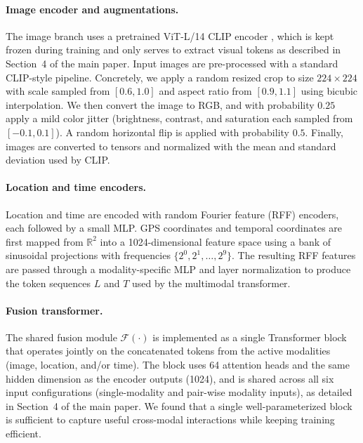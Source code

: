 \vspace{-1em}
\paragraph{Image encoder and augmentations.}
The image branch uses a pretrained ViT-L/14 CLIP encoder \cite{clip}, which is kept frozen during training and only serves to extract visual tokens as described in Section~4 of the main paper.
Input images are pre-processed with a standard CLIP-style pipeline.
Concretely, we apply a random resized crop to size $224\times224$ with scale sampled from $[0.6, 1.0]$ and aspect ratio from $[0.9, 1.1]$ using bicubic interpolation. 
We then convert the image to RGB, and with probability $0.25$ apply a mild color jitter (brightness, contrast, and saturation each sampled from $[-0.1, 0.1]$).
A random horizontal flip is applied with probability $0.5$.
Finally, images are converted to tensors and normalized with the mean and standard deviation used by CLIP.

\vspace{-1em}
\paragraph{Location and time encoders.}
Location and time are encoded with random Fourier feature (RFF) encoders, each followed by a small MLP.
GPS coordinates and temporal coordinates are first mapped from $\mathbb{R}^2$ into a 1024-dimensional feature space using a bank of sinusoidal projections with frequencies $\{2^0, 2^1, \dots, 2^9\}$.
The resulting RFF features are passed through a modality-specific MLP and layer normalization to produce the token sequences $L$ and $T$ used by the multimodal transformer.

\vspace{-1em}
\paragraph{Fusion transformer.}
The shared fusion module $\mathcal{F}(\cdot)$ is implemented as a single Transformer block that operates jointly on the concatenated tokens from the active modalities (image, location, and/or time).
The block uses 64 attention heads and the same hidden dimension as the encoder outputs (1024), and is shared across all six input configurations (single-modality and pair-wise modality inputs), as detailed in Section~4 of the main paper.
We found that a single well-parameterized block is sufficient to capture useful cross-modal interactions while keeping training efficient.

